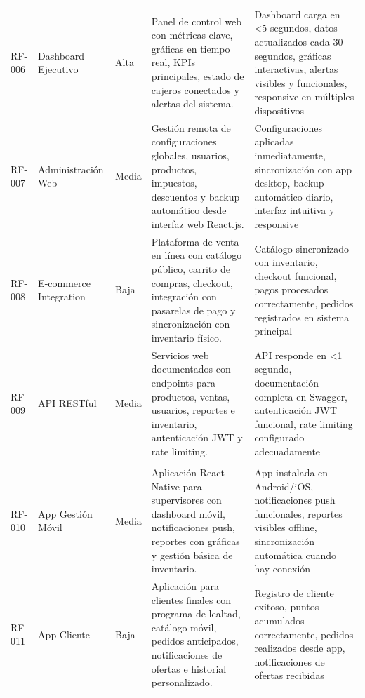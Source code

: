 \documentclass[12pt,letterpaper]{article}
\begin{document}
\begin{longtable}{|>{\centering}p{1.5cm}|p{3.5cm}|>{\centering}p{2cm}|p{6.5cm}|>{\centering\arraybackslash}p{2.5cm}|}
\multicolumn{5}{|c|}{\cellcolor{cobraorange!20}\textbf{FASE 2: PORTAL WEB}} \\
\hline

RF-006 & Dashboard Ejecutivo & Alta & Panel de control web con métricas clave, gráficas en tiempo real, KPIs principales, estado de cajeros conectados y alertas del sistema. & Dashboard carga en <5 segundos, datos actualizados cada 30 segundos, gráficas interactivas, alertas visibles y funcionales, responsive en múltiples dispositivos \\
\hline

RF-007 & Administración Web & Media & Gestión remota de configuraciones globales, usuarios, productos, impuestos, descuentos y backup automático desde interfaz web React.js. & Configuraciones aplicadas inmediatamente, sincronización con app desktop, backup automático diario, interfaz intuitiva y responsive \\
\hline

RF-008 & E-commerce Integration & Baja & Plataforma de venta en línea con catálogo público, carrito de compras, checkout, integración con pasarelas de pago y sincronización con inventario físico. & Catálogo sincronizado con inventario, checkout funcional, pagos procesados correctamente, pedidos registrados en sistema principal \\
\hline

RF-009 & API RESTful & Media & Servicios web documentados con endpoints para productos, ventas, usuarios, reportes e inventario, autenticación JWT y rate limiting. & API responde en <1 segundo, documentación completa en Swagger, autenticación JWT funcional, rate limiting configurado adecuadamente \\
\hline

\multicolumn{5}{|c|}{\cellcolor{cobraorange!20}\textbf{FASE 3: APLICACIONES MÓVILES}} \\
\hline

RF-010 & App Gestión Móvil & Media & Aplicación React Native para supervisores con dashboard móvil, notificaciones push, reportes con gráficas y gestión básica de inventario. & App instalada en Android/iOS, notificaciones push funcionales, reportes visibles offline, sincronización automática cuando hay conexión \\
\hline

RF-011 & App Cliente & Baja & Aplicación para clientes finales con programa de lealtad, catálogo móvil, pedidos anticipados, notificaciones de ofertas e historial personalizado. & Registro de cliente exitoso, puntos acumulados correctamente, pedidos realizados desde app, notificaciones de ofertas recibidas \\
\hline
\end{longtable}
\end{document}
